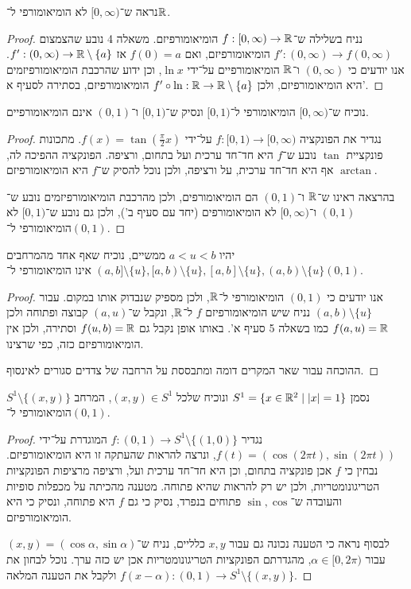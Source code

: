 \subquestion{}
נראה ש־$[0, \infty)$ לא הומיאומורפי ל־$\mathbb{R}$.
\begin{proof}
	נניח בשלילה ש־$f : [0, \infty) \to \mathbb{R}$ הומיאומורפיזם.
	משאלה 4 נובע שהצמצום $f' : (0, \infty) \to f(0, \infty)$ הומיאומורפיזם, ואם $f(0) = a$ אז $f' : (0, \infty) \to \mathbb{R} \setminus \{ a \}$.
	אנו יודעים כי $(0, \infty)$ ו־$\mathbb{R}$ הומיאומורפיים על־ידי $\ln x$, וכן ידוע שהרכבת הומיאומורפיזמים היא הומיאומורפיזם, ולכן $f' \circ \ln : \mathbb{R} \to \mathbb{R} \setminus \{ a \}$ הומיאומורפיזם, בסתירה לסעיף א'.
\end{proof}

\subquestion{}
נוכיח ש־$[0, \infty)$ הומיאומורפי ל־$[0, 1)$ ונסיק ש־$[0, 1)$ ו־$(0, 1)$ אינם הומיאומורפיים.
\begin{proof}
	נגדיר את הפונקציה $f: [0, 1) \to [0, \infty)$ על־ידי $f(x) = \tan(\frac{\pi}{2} x)$.
	מתכונות פונקציית $\tan$ נובע ש־$f$ היא חד־חד ערכית ועל בתחום, ורציפה.
	הפונקציה ההפיכה לה, $\arctan$ אף היא חד־חד ערכית, על ורציפה, ולכן נוכל להסיק ש־$f$ היא הומיאומורפיזם.

	בהרצאה ראינו ש־$\mathbb{R}$ ו־$(0, 1)$ הם הומיאומורפים, ולכן מהרכבת הומיאומורפיזמים נובע ש־$(0, 1)$ ו־$[0, \infty)$ לא הומיאומורפים (יחד עם סעיף ב'), ולכן גם נובע ש־$[0, 1)$ לא הומיאומורפי ל־$(0, 1)$.
\end{proof}

\question{}
\subquestion{}
יהיו $a < u < b$ ממשיים, נוכיח שאף אחד מהמרחבים $(a, b] \setminus \{ u \}, [a, b) \setminus \{ u \}, [a, b] \setminus \{ u \}, (a, b) \setminus \{ u \}$ אינו הומיאומורפי ל־$(0, 1)$.
\begin{proof}
	אנו יודעים כי $(0, 1)$ הומיאומורפי ל־$\mathbb{R}$, ולכן מספיק שנבדוק אותו במקום.
	עבור $(a, b) \setminus \{ u \}$ נניח שיש הומיאומורפיזם $f$ ל־$\mathbb{R}$, ונקבל ש־$(a, u)$ קבוצה ופתוחה ולכן $f(a, u) = \mathbb{R}$ כמו בשאלה 5 סעיף א'.
	באותו אופן נקבל גם $f(u, b) = \mathbb{R}$ וסתירה, ולכן אין הומיאומורפיזם כזה, כפי שרצינו.

	ההוכחה עבור שאר המקרים דומה ומתבססת על הרחבה של צדדים סגורים לאינסוף.
\end{proof}

\subquestion{}
נסמן $S^1 = \{ x \in \mathbb{R}^2 \mid |x| = 1 \}$ ונוכיח שלכל $(x, y) \in S^1$, המרחב $S^1 \setminus \{ (x, y) \}$ הומיאומורפי ל־$(0, 1)$.
\begin{proof}
	נגדיר $f : (0, 1) \to S^1 \setminus \{ (1, 0) \}$ המוגדרת על־ידי $f(t) = (\cos(2\pi t), \sin(2\pi t))$, ונרצה להראות שהעתקה זו היא הומיאומורפיזם.
	נבחין כי $f$ אכן פונקציה בתחום, וכן היא חד־חד ערכית ועל, ורציפה מרציפות הפונקציות הטריגונומטריות, ולכן יש רק להראות שהיא פתוחה.
	מטענה מהכיתה על מכפלות סופיות והעובדה ש־$\sin, \cos$ פתוחים בנפרד, נסיק כי גם $f$ היא פתוחה, ונסיק כי היא הומיאומורפיזם.

	לבסוף נראה כי הטענה נכונה גם עבור $x, y$ כלליים, נניח ש־$(x, y) = (\cos \alpha, \sin \alpha)$ עבור $\alpha \in [0, 2\pi)$, מהגדרתם הפונקציות הטריגונומטריות אכן יש כזה ערך.
	נוכל לבחון את $f(x - \alpha) : (0, 1) \to S^1 \setminus \{ (x, y) \}$ ולקבל את הטענה המלאה.
\end{proof}

